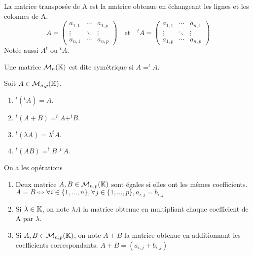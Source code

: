 \documentclass[a4paper, 12pt]{article}
\begin{document}
\begin{definition}
    La matrice transposée de A est la matrice obtenue en échangeant les lignes et les colonnes de A.
    $$
        A = \begin{pmatrix}
            a_{1, 1} & \cdots & a_{1, p} \\
            \vdots & \ddots & \vdots \\
            a_{n, 1} & \cdots & a_{n, p}
        \end{pmatrix}
        \quad \text{et} \quad
        ^tA = \begin{pmatrix}
            a_{1, 1} & \cdots & a_{n, 1} \\
            \vdots & \ddots & \vdots \\
            a_{1, p} & \cdots & a_{n, p}
        \end{pmatrix}
    $$
    Notée aussi $A^t$ ou $^tA$.
\end{definition}

\begin{definition}
    Une matrice $\mathcal{M}_{n}(\mathbb{K})$ est dite symétrique si $A = ^tA$.
\end{definition}

\begin{remarque}
    Soit $A \in \mathcal{M}_{n, p}(\mathbb{K})$.
    \begin{enumerate}
        \item $^t(^tA) = A$.
        \item $^t(A + B) = ^tA + ^tB$.
        \item $^t(\lambda A) = \lambda ^tA$.
        \item $^t(AB) = ^tB \cdot ^tA$.
    \end{enumerate}
\end{remarque}

\begin{definition} On a les opérations
    \begin{enumerate}
        \item 
        Deux matrice $A, B \in \mathcal{M}_{n, p}(\mathbb{K})$ sont égales si elles ont les mêmes coefficients.
        $A = B \iff \forall i \in \{1, ..., n\}, \forall j \in \{1, ..., p\}, a_{i, j} = b_{i, j}$
        \item Si $\lambda \in \mathbb{K}$, on note $\lambda A$ la matrice obtenue en multipliant chaque coefficient de A par $\lambda$.
        \item Si $A, B \in \mathcal{M}_{n, p}(\mathbb{K})$, on note $A + B$ la matrice obtenue en additionnant les coefficients correspondants.
        $A + B = (a_{i, j} + b_{i, j})$
    \end{enumerate}
\end{definition}
\end{document}
